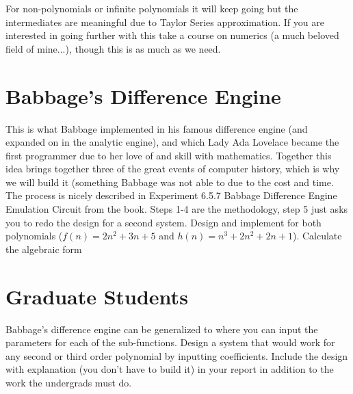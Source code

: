 For non-polynomials or infinite polynomials it will keep going but the intermediates are meaningful due to Taylor Series approximation.  If you are interested in going further with this take a course on numerics (a much beloved field of mine...), though this is as much as we need.  

\section{Babbage's Difference Engine}
This is what Babbage implemented in his famous difference engine (and expanded on in the analytic engine), and which Lady Ada Lovelace became the first programmer due to her love of and skill with mathematics.  Together this idea brings together three of the great events of computer history, which is why we will build it (something Babbage was not able to due to the cost and time.   The process is nicely described in Experiment 6.5.7 Babbage Difference Engine Emulation Circuit from the book.  Steps 1-4 are the methodology, step 5 just asks you to redo the design for a second system.  Design and implement for both polynomials ($f(n)=2n^2+3n+5$ and $h(n)=n^3+2n^2+2n+1$).  Calculate the algebraic form

\section{Graduate Students}
Babbage's difference engine can be generalized to where you can input the parameters for each of the sub-functions.  Design a system that would work for any second or third order polynomial by inputting coefficients.  Include the design with explanation (you don't have to build it) in your report in addition to the work the undergrads must do.
 

